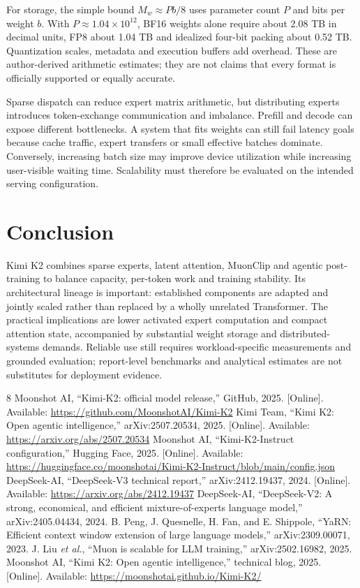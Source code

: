 \documentclass[conference]{IEEEtran}
\begin{document}
For storage, the simple bound $M_w\approx Pb/8$ uses parameter count $P$ and bits per weight $b$. With $P\approx1.04\times10^{12}$, BF16 weights alone require about 2.08 TB in decimal units, FP8 about 1.04 TB and idealized four-bit packing about 0.52 TB. Quantization scales, metadata and execution buffers add overhead. These are author-derived arithmetic estimates; they are not claims that every format is officially supported or equally accurate.

Sparse dispatch can reduce expert matrix arithmetic, but distributing experts introduces token-exchange communication and imbalance. Prefill and decode can expose different bottlenecks. A system that fits weights can still fail latency goals because cache traffic, expert transfers or small effective batches dominate. Conversely, increasing batch size may improve device utilization while increasing user-visible waiting time. Scalability must therefore be evaluated on the intended serving configuration.

\section{Conclusion}
Kimi K2 combines sparse experts, latent attention, MuonClip and agentic post-training to balance capacity, per-token work and training stability. Its architectural lineage is important: established components are adapted and jointly scaled rather than replaced by a wholly unrelated Transformer. The practical implications are lower activated expert computation and compact attention state, accompanied by substantial weight storage and distributed-systems demands. Reliable use still requires workload-specific measurements and grounded evaluation; report-level benchmarks and analytical estimates are not substitutes for deployment evidence.

\begin{thebibliography}{8}
 Moonshot AI, ``Kimi-K2: official model release,'' GitHub, 2025. [Online]. Available: \url{https://github.com/MoonshotAI/Kimi-K2}
 Kimi Team, ``Kimi K2: Open agentic intelligence,'' arXiv:2507.20534, 2025. [Online]. Available: \url{https://arxiv.org/abs/2507.20534}
 Moonshot AI, ``Kimi-K2-Instruct configuration,'' Hugging Face, 2025. [Online]. Available: \url{https://huggingface.co/moonshotai/Kimi-K2-Instruct/blob/main/config.json}
 DeepSeek-AI, ``DeepSeek-V3 technical report,'' arXiv:2412.19437, 2024. [Online]. Available: \url{https://arxiv.org/abs/2412.19437}
 DeepSeek-AI, ``DeepSeek-V2: A strong, economical, and efficient mixture-of-experts language model,'' arXiv:2405.04434, 2024.
 B. Peng, J. Quesnelle, H. Fan, and E. Shippole, ``YaRN: Efficient context window extension of large language models,'' arXiv:2309.00071, 2023.
 J. Liu \emph{et al.}, ``Muon is scalable for LLM training,'' arXiv:2502.16982, 2025.
 Moonshot AI, ``Kimi K2: Open agentic intelligence,'' technical blog, 2025. [Online]. Available: \url{https://moonshotai.github.io/Kimi-K2/}
\end{thebibliography}
\end{document}
